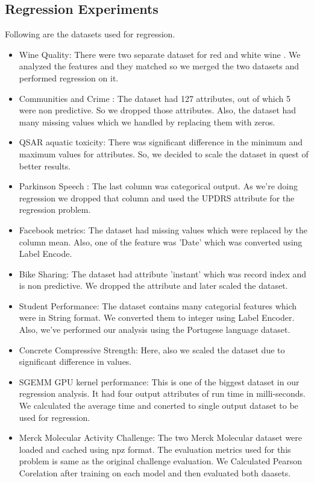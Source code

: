 \documentclass[10pt,twocolumn,letterpaper]{article}
\begin{document}

\subsection{Regression Experiments}
Following are the datasets used for regression.
\begin{itemize}
    \item Wine Quality: There were two separate dataset for red and white wine . We analyzed the features and they matched so we merged the two datasets and performed regression on it.
    \item Communities and Crime : The dataset had 127 attributes, out of which 5 were non predictive. So we dropped those attributes. Also, the dataset had many missing values which we handled by replacing them with zeros.
    \item QSAR aquatic toxicity: There was significant difference in the minimum and maximum values for attributes. So, we decided to scale the dataset in quest of better results.
    \item Parkinson Speech : The last column was categorical output. As we're doing regression we dropped that column and used the UPDRS attribute for the regression problem.
    \item Facebook metrics: The dataset had missing values which were replaced by the column mean. Also, one of the feature was 'Date' which was converted using Label Encode.
    \item Bike Sharing: The dataset had attribute 'instant' which was record index and is non predictive. We dropped the attribute and later scaled the dataset.
    \item Student Performance: The dataset contains many categorial features which were in String format. We converted them to integer using Label Encoder. Also, we've performed our analysis using the Portugese language dataset.
    \item Concrete Compressive Strength: Here, also we scaled the dataset due to significant difference in values. 
    \item SGEMM GPU kernel performance: This is one of the biggest dataset in our regression analysis. It had four output attributes of run time in milli-seconds. We  calculated the average time and conerted to single output dataset to be used for regression.
    \item Merck Molecular Activity Challenge: The two Merck Molecular dataset were loaded and cached using npz format. The evaluation metrics used for this problem is same as the original challenge evaluation. We Calculated Pearson Corelation after training on each model and then evaluated both daasets.
\end{itemize}
\end{document}
